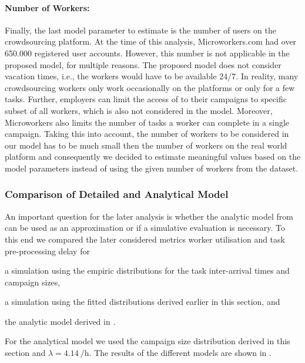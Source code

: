 \paragraph*{Number of Workers: }Finally, the last model parameter to estimate is the number of users \numberOfWorkers on the crowdsourcing platform. 
At the time of this analysis, Microworkers.com had over 650.000 registered user accounts.
However, this number is not applicable in the proposed model, for multiple reasons.
The proposed model does not consider vacation times, i.e., the workers would have to be available 24/7.
In reality, many crowdsourcing workers only work occasionally on the platforms or only for a few tasks.
Further, employers can limit the access of to their campaigns to specific subset of all workers, which is also not considered in the model.
Moreover, Microworkers also limits the number of tasks a worker can complete in a single campaign.
Taking this into account, the number of workers to be considered in our model has to be much small then the number of workers on the real world platform and consequently we decided to estimate meaningful values based on the model parameters instead of using the given number of workers from the dataset.

\subsubsection*{Comparison of Detailed and Analytical Model}
An important question for the later analysis is whether the analytic model from  can be used as an approximation or if a simulative evaluation is necessary.
To this end we compared the later considered metrics worker utilisation \workerUtilization and task pre-processing delay \preTaskProcessingDelay for 
\begin{enumerate*}
\item a simulation using the empiric distributions for the task inter-arrival times and campaign sizes,
\item a simulation using the fitted distributions derived earlier in this section, and
\item the analytic model derived in .
\end{enumerate*}
For the analytical model we used the campaign size distribution derived in this section and \(\lambda=\SI{4.14}{\per\hour}\).
The results of the different models are shown in .

